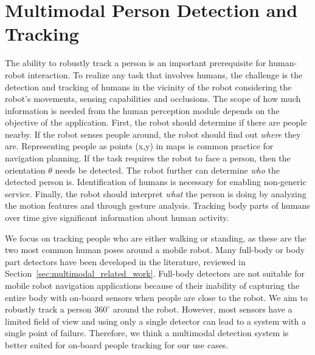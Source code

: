 \chapter{Multimodal Person Detection and Tracking}
\label{chapter:multimodal_person_detection_and_tracking}
The ability to robustly track a person is an important prerequisite for human-robot interaction. To realize any task that involves humans, the challenge is the detection and tracking of humans in the vicinity of the robot considering the robot's movements, sensing capabilities and occlusions. The scope of how much information is needed from the human perception module depends on the objective of the application. First, the robot should determine if there are people nearby. If the robot senses people around, the robot should find out \emph{where} they are. Representing people as points (x,y) in maps is common practice for navigation planning. If the task requires the robot to face a person, then the orientation $\theta$ needs be detected. The robot further can determine \emph{who} the detected person is. Identification of humans is necessary for enabling non-generic service. Finally, the robot should interpret \emph{what} the person is doing by analyzing the motion features and through gesture analysis. Tracking body parts of humans over time give significant information about human activity.

We focus on tracking people who are either walking or standing, as these are the two most common human poses around a mobile robot. Many full-body or body part detectors have been developed in the literature, reviewed in Section~\ref{sec:multimodal_related_work}. Full-body detectors are not suitable for mobile robot navigation applications because of their inability of capturing the entire body with on-board sensors when people are close to the robot. We aim to robustly track a person $360^{\circ}$ around the robot. However, most sensors have a limited field of view and using only a single detector can lead to a system with a single point of failure. Therefore, we think a multimodal detection system is better suited for on-board people tracking for our use cases. 


